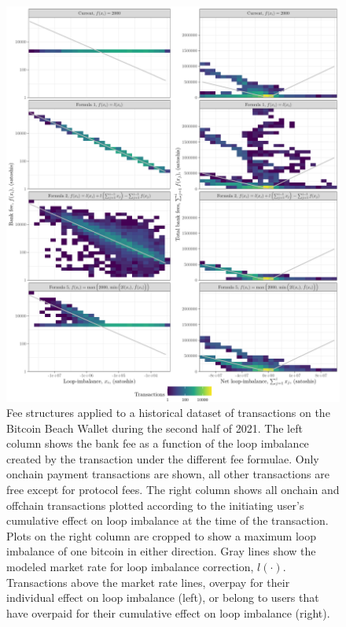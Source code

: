 \documentclass[10pt,twocolumn]{article}
\begin{document}
\begin{figure}[p]
	\includegraphics[width=\textwidth]{fig/replay/full}
	\caption[Fee structures]{ \label{sims}
		Fee structures applied to a historical dataset of transactions
		on the Bitcoin Beach Wallet during the second half of 2021.
		The left column shows the bank fee as a function of the loop imbalance
		created by the transaction under the different fee formulae.
		Only onchain payment transactions are shown, all other transactions
		are free except for protocol fees.
		The right column shows all onchain and offchain transactions
		plotted according to the initiating user's cumulative effect on loop imbalance
		at the time of the transaction.
		Plots on the right column are cropped to show a maximum
		loop imbalance of one bitcoin in either direction.
		Gray lines show the modeled market rate for loop imbalance correction, $l(\cdot)$.
		Transactions above the market rate lines,
		overpay for their individual effect on loop imbalance (left),
		or belong to users that have overpaid
		for their cumulative effect on loop imbalance (right).
	}
\end{figure}
\end{document}
